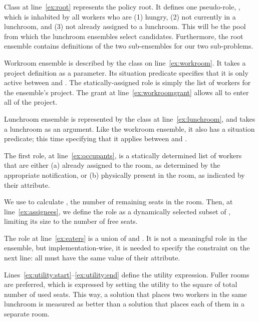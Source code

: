 Class  at line~\ref{ex:root} represents the policy root. It defines
one pseudo-role, , which is inhabited by all workers who are (1)
hungry, (2) not currently in a lunchroom, and (3) not already assigned to a lunchroom.
This will be the pool from which the lunchroom ensembles select candidates. Furthermore,
the root ensemble contains definitions of the two sub-ensembles for our two
sub-problems.

Workroom ensemble is described by the class  on
line~\ref{ex:workroom}. It takes a project definition as a parameter. Its situation
predicate specifies that it is only active between  and
. The statically-assigned role  is simply the
list of workers for the ensemble's project. The grant at line~\ref{ex:workroomgrant}
allows all  to enter all  of the project.

\medskip

Lunchroom ensemble is represented by the  class at
line~\ref{ex:lunchroom}, and takes a lunchroom as an argument. Like the workroom
ensemble, it also has a situation predicate; this time specifying that it applies
between  and .

The first role,  at line~\ref{ex:occupants}, is a statically determined
list of workers that are either (a) already assigned to the room, as determined by the
appropriate  notification, or (b) physically present in the room,
as indicated by their  attribute.

We use  to calculate , the number of remaining seats in the
room. Then, at line~\ref{ex:assignees}, we define the  role as a
dynamically selected subset of , limiting its size to the number of
free seats.

The  role at line~\ref{ex:eaters} is a union of  and
. It is not a meaningful role in the ensemble, but implementation-wise, it
is needed to specify the constraint on the next line: all  must have the same
value of their  attribute.

Lines~\ref{ex:utility:start}--\ref{ex:utility:end} define the utility expression. Fuller
rooms are preferred, which is expressed by setting the utility to the square of total
number of used seats. This way, a solution that places two workers in the same lunchroom
is measured as better than a solution that places each of them in a separate room.

